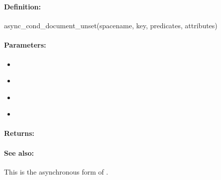 \pagebreak
\subsubsection{}
\label{api:ruby:async_cond_document_unset}


\paragraph{Definition:}
\begin{rubycode}
async_cond_document_unset(spacename, key, predicates, attributes)
\end{rubycode}

\paragraph{Parameters:}
\begin{itemize}[noitemsep]
\item {}\\

\item {}\\

\item {}\\

\item {}\\

\end{itemize}

\paragraph{Returns:}


\paragraph{See also:}  This is the asynchronous form of .

\pagebreak
\subsubsection{}
\label{api:ruby:group_document_unset}


